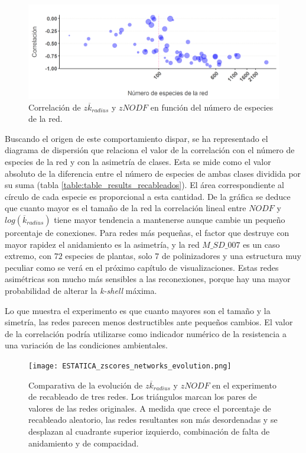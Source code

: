 \begin{figure}[h!]
\centering
\includegraphics[scale=0.6]{Figures/ESTATITCA_asimetria_corr.png}
\caption {Correlación de $z \overline {k}_{radius}$ y $zNODF$ en función del número de especies de la red.}
\label{fig:ESTATICA_asimetria_corr}
\end{figure}

Buscando el origen de este comportamiento dispar, se ha representado el diagrama de dispersión que relaciona el valor de la correlación con el número de especies de la red y con la asimetría de clases. Esta se mide como el valor absoluto de la diferencia entre el número de especies de ambas clases dividida por su suma (tabla \ref{table:table_results_recableados}). El área correspondiente al círculo de cada especie es proporcional a esta cantidad. De la gráfica se deduce que cuanto mayor es el tamaño de la red la correlación lineal entre $NODF$ y $log(\overline {k}_{radius})$ tiene mayor tendencia a mantenerse aunque cambie un pequeño porcentaje de conexiones. Para redes más pequeñas, el factor que destruye con mayor rapidez el anidamiento es la asimetría, y la red $M\_SD\_007$ es un caso extremo, con $72$ especies de plantas, solo $7$ de polinizadores y una estructura muy peculiar como se verá en el próximo capítulo de visualizaciones. Estas redes asimétricas son mucho más sensibles a las reconexiones, porque hay una mayor probabilidad de alterar la \textit{k-shell} máxima.

Lo que muestra el experimento es que cuanto  mayores son el tamaño y la simetría, las redes parecen menos destructibles ante pequeños cambios. El valor de la correlación podría utilizarse como indicador numérico de la resistencia a una variación de las condiciones ambientales.
\clearpage
\begin{figure}[htp!]
\centering
\texttt{[image: ESTATICA\_zscores\_networks\_evolution.png]}
\caption {Comparativa de la evolución de $z \overline {k}_{radius}$ y $zNODF$ en el experimento de recableado de tres redes. Los triángulos marcan los pares de valores de las redes originales. A medida que crece el porcentaje de recableado aleatorio, las redes resultantes son más desordenadas y se desplazan al cuadrante superior izquierdo, combinación de falta de anidamiento y de compacidad.}
\label{fig:ESTATICA_asimetria_corr}
\end{figure}

